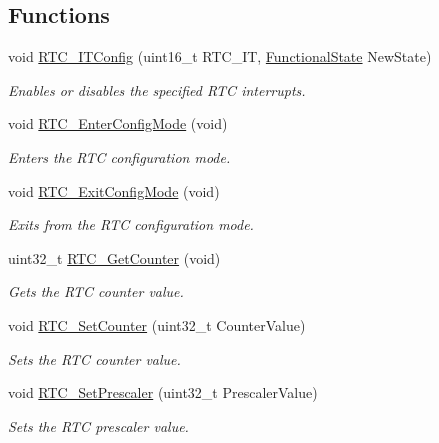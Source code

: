 \subsection*{Functions}
\begin{DoxyCompactItemize}
\item 
void \hyperlink{group___r_t_c___private___functions_ga175dfe88866234730c1ec40d2221c4f4}{R\+T\+C\+\_\+\+I\+T\+Config} (uint16\+\_\+t R\+T\+C\+\_\+\+IT, \hyperlink{group___exported__types_gac9a7e9a35d2513ec15c3b537aaa4fba1}{Functional\+State} New\+State)
\begin{DoxyCompactList}\small\item\em Enables or disables the specified R\+TC interrupts. \end{DoxyCompactList}\item 
void \hyperlink{group___r_t_c___private___functions_ga23612d9da2fe057a0cd72c684e5b438a}{R\+T\+C\+\_\+\+Enter\+Config\+Mode} (void)
\begin{DoxyCompactList}\small\item\em Enters the R\+TC configuration mode. \end{DoxyCompactList}\item 
void \hyperlink{group___r_t_c___private___functions_ga7585aa6e2dbb497173b2fd03bac0d304}{R\+T\+C\+\_\+\+Exit\+Config\+Mode} (void)
\begin{DoxyCompactList}\small\item\em Exits from the R\+TC configuration mode. \end{DoxyCompactList}\item 
uint32\+\_\+t \hyperlink{group___r_t_c___private___functions_ga6edb19a0ad8414a40610341121c5ea6c}{R\+T\+C\+\_\+\+Get\+Counter} (void)
\begin{DoxyCompactList}\small\item\em Gets the R\+TC counter value. \end{DoxyCompactList}\item 
void \hyperlink{group___r_t_c___private___functions_gafa81ec17158de1d1a7740eca81b9fb65}{R\+T\+C\+\_\+\+Set\+Counter} (uint32\+\_\+t Counter\+Value)
\begin{DoxyCompactList}\small\item\em Sets the R\+TC counter value. \end{DoxyCompactList}\item 
void \hyperlink{group___r_t_c___private___functions_gaf76be6071d1ba65b009e0791069e602c}{R\+T\+C\+\_\+\+Set\+Prescaler} (uint32\+\_\+t Prescaler\+Value)
\begin{DoxyCompactList}\small\item\em Sets the R\+TC prescaler value. \end{DoxyCompactList}\item 

\end{DoxyCompactItemize}
